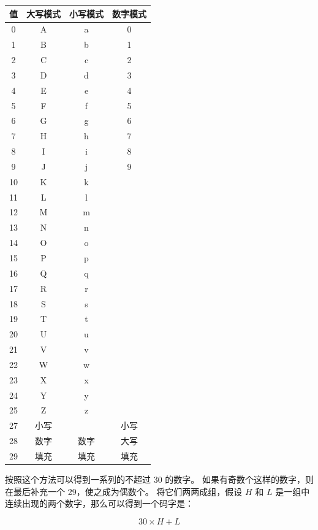 \begin{table}[H]
\centering
\begin{tabular}{cccc}
    \toprule
    值 & 大写模式 & 小写模式 & 数字模式 \\
    \midrule
    0 & A & a & 0 \\
    1 & B & b & 1 \\
    2 & C & c & 2 \\
    3 & D & d & 3 \\
    4 & E & e & 4 \\
    5 & F & f & 5 \\
    6 & G & g & 6 \\
    7 & H & h & 7 \\
    8 & I & i & 8 \\
    9 & J & j & 9 \\
    10 & K & k &  \\
    11 & L & l &  \\
    12 & M & m &  \\
    13 & N & n &  \\
    14 & O & o &  \\
    15 & P & p &  \\
    16 & Q & q &  \\
    17 & R & r &  \\
    18 & S & s &  \\
    19 & T & t &  \\
    20 & U & u &  \\
    21 & V & v &  \\
    22 & W & w &  \\
    23 & X & x &  \\
    24 & Y & y &  \\
    25 & Z & z &  \\
    27 & 小写 &   & 小写 \\
    28 & 数字 & 数字 & 大写 \\
    29 & 填充 & 填充 & 填充 \\
    \bottomrule
\end{tabular}
\end{table}

按照这个方法可以得到一系列的不超过 30 的数字。
如果有奇数个这样的数字，则在最后补充一个 29，使之成为偶数个。
将它们两两成组，假设 $H$ 和 $L$ 是一组中连续出现的两个数字，那么可以得到一个码字是：

\begin{equation*}
    30 \times H + L
\end{equation*}

